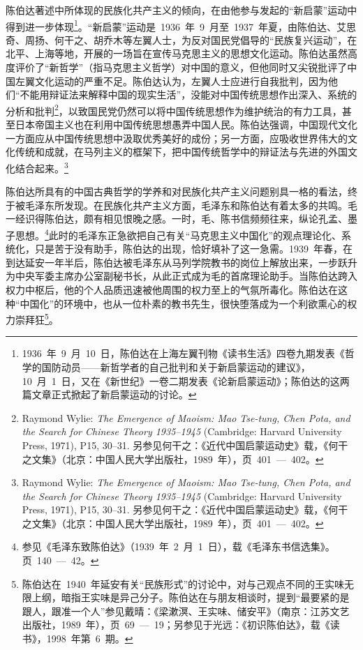 陈伯达著述中所体现的民族化共产主义的倾向，在由他参与发起的“新启蒙”运动中得到进一步体现\footnote{1936~年~9~月~10~日，陈伯达在上海左翼刊物《读书生活》四卷九期发表《哲学的国防动员——新哲学者的自己批判和关于新启蒙运动的建议》，10~月~1~日，又在《新世纪》一卷二期发表《论新启蒙运动》；陈伯达的这两篇文章正式掀起了新启蒙运动的讨论。}。“新启蒙”运动是~1936~年~9~月至~1937~年夏，由陈伯达、艾思奇、周扬、何干之、胡乔木等左翼人士，为反对国民党倡导的“民族复兴运动”，在北平、上海等地，开展的一场旨在宣传马克思主义的思想文化运动。陈伯达虽然高度评价了“新哲学”（指马克思主义哲学）对中国的意义，但他同时又尖锐批评了中国左翼文化运动的严重不足。陈伯达认为，左翼人士应进行自我批判，因为他们“不能用辩证法来解释中国的现实生活”，没能对中国传统思想作出深入、系统的分析和批判\footnote{Raymond Wylie: \textit{The Emergence of Maoism: Mao Tse-tung, Chen Pota, and the Search for Chinese Theory 1935--1945} (Cambridge: Harvard University Press, 1971), P15, 30--31. 另参见何干之：《近代中国启蒙运动史》载，《何干之文集》（北京：中国人民大学出版社，1989~年），页~401~—~402。}，以致国民党仍然可以将中国传统思想作为维护统治的有力工具，甚至日本帝国主义也在利用中国传统思想愚弄中国人民。陈伯达强调，中国现代文化一方面应从中国传统思想中汲取优秀美好的成份；另一方面，应吸收世界伟大的文化传统和成就，在马列主义的框架下，把中国传统哲学中的辩证法与先进的外国文化结合起来。\footnote{Raymond Wylie: \textit{The Emergence of Maoism: Mao Tse-tung, Chen Pota, and the Search for Chinese Theory 1935--1945} (Cambridge: Harvard University Press, 1971), P15, 30--31. 另参见何干之：《近代中国启蒙运动史》载，《何干之文集》（北京：中国人民大学出版社，1989~年），页~401~—~402。}

陈伯达所具有的中国古典哲学的学养和对民族化共产主义问题别具一格的看法，终于被毛泽东所发现。在民族化共产主义方面，毛泽东和陈伯达有着太多的共鸣。毛一经识得陈伯达，颇有相见恨晚之感。一时，毛、陈书信频频往来，纵论孔孟、墨子思想。\footnote{参见《毛泽东致陈伯达》（1939~年~2~月~1~日），载《毛泽东书信选集》。页~140~—~42。}此时的毛泽东正急欲把自己有关“马克思主义中国化”的观点理论化、系统化，只是苦于没有助手，陈伯达的出现，恰好填补了这一急需。1939~年春，在到达延安一年半后，陈伯达被毛泽东从马列学院教书的岗位上解放出来，一步跃升为中央军委主席办公室副秘书长，从此正式成为毛的首席理论助手。当陈伯达跨入权力中枢后，他的个人品质迅速被他周围的权力至上的气氛所毒化。陈伯达在这种“中国化”的环境中，也从一位朴素的教书先生，很快堕落成为一个利欲熏心的权力崇拜狂\footnote{陈伯达在~1940~年延安有关“民族形式”的讨论中，对与己观点不同的王实味无限上纲，暗指王实味是异己分子。陈伯达在与朋友相谈时，提到“最要紧的是跟人，跟准一个人”参见戴晴：《梁漱溟、王实味、储安平》（南京：江苏文艺出版社，1989~年），页~69~—~19；另参见于光远：《初识陈伯达》，载《读书》，1998~年第~6~期。}。

